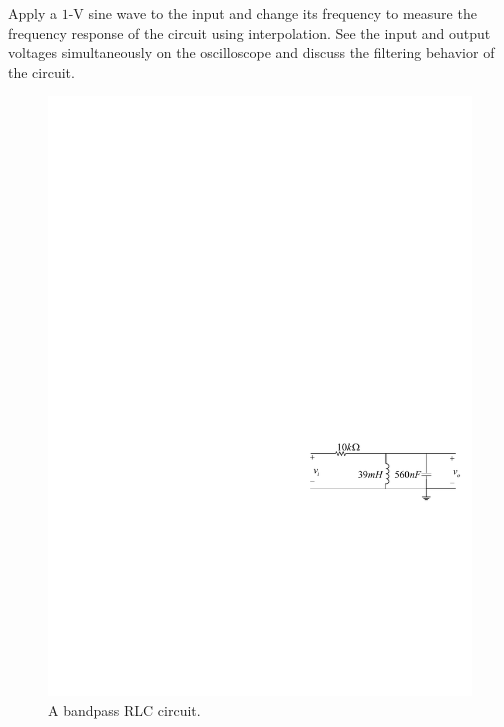 \documentclass[11pt]{article}
\begin{document}
\begin{question}
    \begin{subquestion}{Apply a $1$-V sine wave to the input and change its frequency to measure the frequency response of the circuit using interpolation. See the input and output voltages simultaneously on the oscilloscope and discuss the filtering behavior of the circuit.}
        \answer{}
    \end{subquestion}


\end{question}


\begin{question}


    \begin{figure}[H]
        \centering
        \includegraphics[scale=1.2,angle=0]{Fig/cir4.pdf}
        \caption{A bandpass RLC circuit.} \label{fig:cir4}
    \end{figure}


\end{question}
\end{document}
